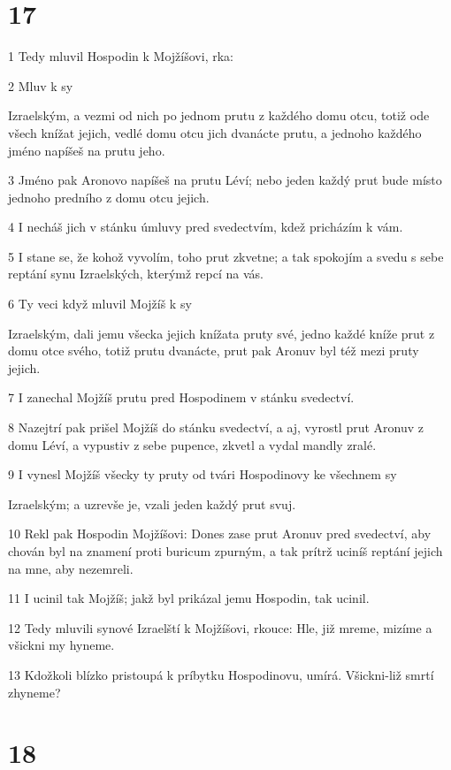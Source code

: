 \chapter{17}

\par 1 Tedy mluvil Hospodin k Mojžíšovi, rka:
\par 2 Mluv k sy\par Izraelským, a vezmi od nich po jednom prutu z každého domu otcu, totiž ode všech knížat jejich, vedlé domu otcu jich dvanácte prutu, a jednoho každého jméno napíšeš na prutu jeho.
\par 3 Jméno pak Aronovo napíšeš na prutu Léví; nebo jeden každý prut bude místo jednoho predního z domu otcu jejich.
\par 4 I necháš jich v stánku úmluvy pred svedectvím, kdež pricházím k vám.
\par 5 I stane se, že kohož vyvolím, toho prut zkvetne; a tak spokojím a svedu s sebe reptání synu Izraelských, kterýmž repcí na vás.
\par 6 Ty veci když mluvil Mojžíš k sy\par Izraelským, dali jemu všecka jejich knížata pruty své, jedno každé kníže prut z domu otce svého, totiž prutu dvanácte, prut pak Aronuv byl též mezi pruty jejich.
\par 7 I zanechal Mojžíš prutu pred Hospodinem v stánku svedectví.
\par 8 Nazejtrí pak prišel Mojžíš do stánku svedectví, a aj, vyrostl prut Aronuv z domu Léví, a vypustiv z sebe pupence, zkvetl a vydal mandly zralé.
\par 9 I vynesl Mojžíš všecky ty pruty od tvári Hospodinovy ke všechnem sy\par Izraelským; a uzrevše je, vzali jeden každý prut svuj.
\par 10 Rekl pak Hospodin Mojžíšovi: Dones zase prut Aronuv pred svedectví, aby chován byl na znamení proti buricum zpurným, a tak prítrž uciníš reptání jejich na mne, aby nezemreli.
\par 11 I ucinil tak Mojžíš; jakž byl prikázal jemu Hospodin, tak ucinil.
\par 12 Tedy mluvili synové Izraelští k Mojžíšovi, rkouce: Hle, již mreme, mizíme a všickni my hyneme.
\par 13 Kdožkoli blízko pristoupá k príbytku Hospodinovu, umírá. Všickni-liž smrtí zhyneme?

\chapter{18}


